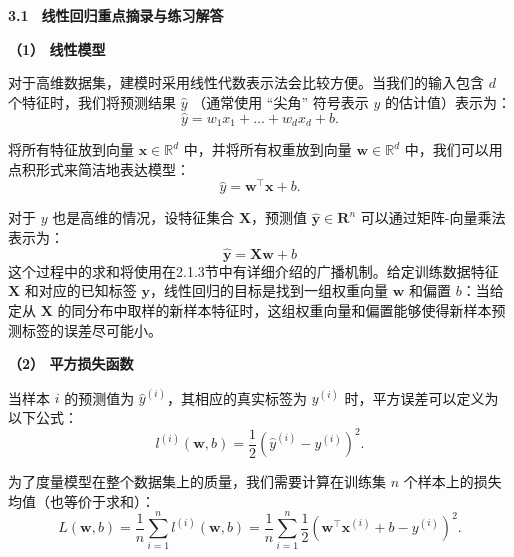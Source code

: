 \documentclass[UTF8]{ctexart}
\begin{document}
	\setlength{\abovedisplayskip}{2pt}
	\setlength{\belowdisplayskip}{2pt}
	\setlength{\abovedisplayshortskip}{2pt}
	\setlength{\belowdisplayshortskip}{2pt}
	\begin{center}
		\heiti{}\textbf{3.1 \, 线性回归重点摘录与练习解答} %
		\vspace{2ex}
	\end{center}
	
	
	\pagestyle{fancy}
	\lhead{}
	\chead{}
	\rhead{}
	\cfoot{\thepage}
	\renewcommand{\headrulewidth}{0pt}
	\renewcommand{\footrulewidth}{0pt} %
	
	\textbf{（1） 线性模型}
	
	对于高维数据集，建模时采用线性代数表示法会比较方便。当我们的输入包含 $d$ 个特征时，我们将预测结果 $\hat{y}$ （通常使用 “尖角” 符号表示 $y$ 的估计值）表示为：
	$$
	\hat{y} = w_1 x_1 + \ldots + w_d x_d + b.
	$$
	
	将所有特征放到向量 $\bm{x} \in \mathbb{R}^d$ 中，并将所有权重放到向量 $\bm{w} \in \mathbb{R}^d$ 中，我们可以用点积形式来简洁地表达模型：
	$$
	\hat{y} = \bm{w}^\top \bm{x} + b.
	$$
	
	对于 $y$ 也是高维的情况，设特征集合 $\bm{X}$，预测值 $\hat{\bm{y}} \in \bm{R}^n$ 可以通过矩阵-向量乘法表示为：
	$$
	\hat{\bm{y}} = \bm{X} \bm{w} + b
	$$
	这个过程中的求和将使用在2.1.3节中有详细介绍的广播机制。给定训练数据特征 $\bm{X}$ 和对应的已知标签 $\bm{y}$，线性回归的目标是找到一组权重向量 $\bm{w}$ 和偏置 $b$：当给定从 $\bm{X}$ 的同分布中取样的新样本特征时，这组权重向量和偏置能够使得新样本预测标签的误差尽可能小。
	
	\textbf{（2） 平方损失函数}
	
	当样本 $ i $ 的预测值为 $\hat{y}^{(i)}$，其相应的真实标签为 $ y^{(i)} $ 时，平方误差可以定义为以下公式：
    \[
    l^{(i)}(\bm{w}, b) = \frac{1}{2} \left( \hat{y}^{(i)} - y^{(i)} \right)^2.
    \]
    
    为了度量模型在整个数据集上的质量，我们需要计算在训练集 $ n $ 个样本上的损失均值（也等价于求和）：
    $$
    L(\bm{w}, b) = \frac{1}{n} \sum_{i=1}^{n} l^{(i)}(\bm{w}, b) = \frac{1}{n} \sum_{i=1}^{n} \frac{1}{2} \left( \bm{w}^\top \bm{x}^{(i)} + b - y^{(i)} \right)^2.
    $$
	
\end{document}
